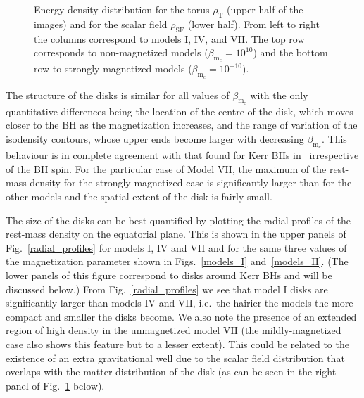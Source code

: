 \documentclass[twocolumn,aps,showpacs,showkeys,prd,superscriptaddress,byrevtex, amsmath]{revtex4-1}
\begin{document}
\begin{figure}
\hspace{-0.2cm}
\caption{Energy density distribution for the torus $\rho_{\mathrm{T}}$ (upper half of the images) and for the scalar field $\rho_{\mathrm{SF}}$ (lower half). From left to right the columns correspond to models I, IV, and VII. The top row corresponds to non-magnetized models ($\beta_{\mathrm{m}_{\mathrm{c}}} = 10^{10}$) and the bottom row to strongly magnetized models ($\beta_{\mathrm{m}_{\mathrm{c}}} = 10^{-10}$).}
\label{comparison_mass_density}
\end{figure}

The structure of the disks is similar for all values of $\beta_{\mathrm{m_c}}$ with the only quantitative differences being the location of the centre of the disk, which moves closer to the BH as the magnetization increases, and the range of variation of the isodensity contours, whose upper ends become larger with decreasing $\beta_{\mathrm{m_c}}$. This behaviour is in complete agreement with that found for Kerr BHs in~\cite{Gimeno-Soler:2017} irrespective of the BH spin. For the particular case of Model VII, the maximum of the rest-mass density for the strongly magnetized case is significantly larger than for the other models and the spatial extent of the disk is fairly small. 

The size of the disks can be best quantified by plotting the radial profiles of the rest-mass density on the equatorial plane. This is shown in the upper panels of Fig.~\ref{radial_profiles} for models I, IV and VII and for the same three values of the magnetization parameter shown in Figs.~\ref{models_I} and~\ref{models_II}. (The lower panels of this figure correspond to disks around Kerr BHs and will be discussed below.) From Fig.~\ref{radial_profiles} we see that model I disks are significantly larger than models IV and VII, i.e.~the hairier the models the more compact and smaller the disks become. We also note the presence of an extended region of high density in the unmagnetized model VII  (the mildly-magnetized case also shows this feature but to a lesser extent). This could be related to the existence of an extra gravitational well due to the scalar field distribution that overlaps with the matter distribution of the disk (as can be seen in the right panel of Fig.~\ref{comparison_mass_density} below).
\end{document}
